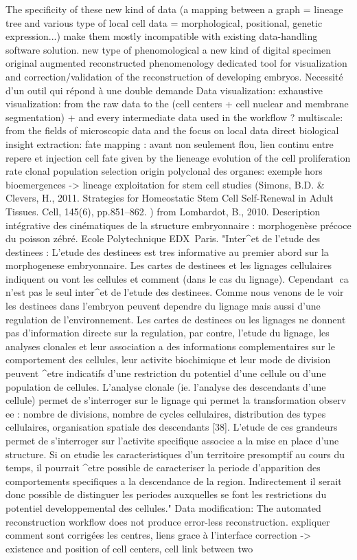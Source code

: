   The specificity of these new kind of data (a mapping between a graph = lineage tree and various type of local cell data = morphological, positional, genetic expression...) make them mostly incompatible with existing data-handling software solution.    new type of phenomological   a new kind of digital specimen  original  augmented reconstructed phenomenology        dedicated tool for visualization and correction/validation of the reconstruction of developing embryos.      Necessité d'un outil qui répond à une double demande   Data visualization:   exhaustive visualization: from the raw data to the (cell centers + cell nuclear and membrane segmentation)  + and every intermediate data used in the workflow ?    multiscale: from the fields of microscopic data and the focus on local data     direct biological insight extraction:        fate mapping : avant non seulement flou, lien continu entre repere et injection    cell fate given by the lieneage    evolution of the cell proliferation rate    clonal population selection    origin polyclonal des organes:     exemple hors bioemergences -> lineage exploitation for stem cell studies (Simons, B.D. \& Clevers, H., 2011. Strategies for Homeostatic Stem Cell Self-Renewal in Adult Tissues. Cell, 145(6), pp.851–862. \cite{Simons:2011ec})  from Lombardot, B., 2010. Description intégrative des cinématiques de la structure embryonnaire : morphogenèse précoce du poisson zébré. Ecole Polytechnique EDX Paris.  "Inter^et de l'etude des destinees : L'etude des destinees est tres informative au premier abord sur la morphogenese embryonnaire. Les cartes de destinees et les lignages cellulaires indiquent ou vont les cellules et comment (dans le cas du lignage). Cependant ca n'est pas le seul inter^et de l'etude des destinees. Comme nous venons de le voir les destinees dans l'embryon peuvent dependre du lignage mais aussi d'une regulation de l'environnement. Les cartes de destinees ou les lignages ne donnent pas d'information directe sur la regulation, par contre, l'etude du lignage, les analyses clonales et leur association a des informations complementaires sur le comportement des cellules, leur activite biochimique et leur mode de division peuvent ^etre indicatifs d'une restriction du potentiel d'une cellule ou d'une population de cellules. L'analyse clonale (ie. l'analyse des descendants d'une cellule) permet de s'interroger sur le lignage qui permet la transformation observ ee : nombre de divisions, nombre de cycles cellulaires, distribution des types cellulaires, organisation spatiale des descendants [38]. L'etude de ces grandeurs permet de s'interroger sur l'activite specifique associee a la mise en place d'une structure. Si on etudie les caracteristiques d'un territoire presomptif au cours du temps, il pourrait ^etre possible de caracteriser la periode d'apparition des comportements specifiques a la descendance de la region. Indirectement il serait donc possible de distinguer les periodes auxquelles se font les restrictions du potentiel developpemental des cellules."                      Data modification:   The automated reconstruction workflow does not produce error-less reconstruction.    expliquer comment sont corrigées les centres, liens grace à l'interface  correction -> existence and position of cell centers, cell link between two 